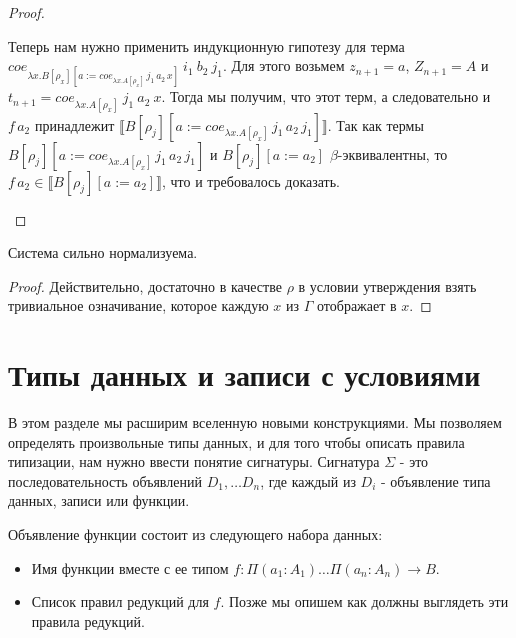 \documentclass{amsart}
\theoremstyle{definition}
\theoremstyle{remark}
\renewcommand{\ll}{\llbracket}
\newcommand{\rr}{\rrbracket}
\numberwithin{figure}{section}
\begin{document}
\begin{proof}
\begin{itemize}
Теперь нам нужно применить индукционную гипотезу для терма $coe_{\lambda x. B[\rho_x][a := coe_{\lambda x. A[\rho_x]}\,j_1\,a_2\,x]}\ i_1\ b_2\ j_1$.
Для этого возьмем $z_{n+1} = a$, $Z_{n+1} = A$ и $t_{n+1} = coe_{\lambda x. A[\rho_x]}\ j_1\ a_2\ x$.
Тогда мы получим, что этот терм, а следовательно и $f\,a_2$ принадлежит $\ll B[\rho_j][a := coe_{\lambda x. A[\rho_x]}\,j_1\,a_2\,j_1] \rr$.
Так как термы $B[\rho_j][a := coe_{\lambda x. A[\rho_x]}\,j_1\,a_2\,j_1]$ и $B[\rho_j][a := a_2]$ $\beta$-эквивалентны,
    то $f\,a_2 \in \ll B[\rho_j][a := a_2] \rr$, что и требовалось доказать.

\end{itemize}
\end{proof}

\begin{cor}
Система сильно нормализуема.
\end{cor}
\begin{proof}
Действительно, достаточно в качестве $\rho$ в условии утверждения взять тривиальное означивание, которое каждую $x$ из $\Gamma$ отображает в $x$.
\end{proof}

\section{Типы данных и записи с условиями}

В этом разделе мы расширим вселенную новыми конструкциями.
Мы позволяем определять произвольные типы данных, и для того чтобы описать правила типизации, нам нужно ввести понятие сигнатуры.
Сигнатура $\Sigma$ - это последовательность объявлений $D_1, \ldots D_n$, где каждый из $D_i$ - объявление типа данных, записи или функции.

Объявление функции состоит из следующего набора данных:
\begin{itemize}
\item Имя функции вместе с ее типом $f : \Pi (a_1 : A_1) \ldots \Pi (a_n : A_n) \to B$.
\item Список правил редукций для $f$. Позже мы опишем как должны выглядеть эти правила редукций.
\end{itemize}
\end{document}
